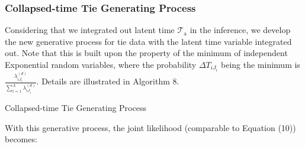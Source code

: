 \documentclass[a4paper]{article}
\begin{document}
        \subsubsection{Collapsed-time Tie Generating Process} \label{subsubsec: collapsed time Generative Process}
        Considering that we integrated out latent time $\mathcal{T}_{\mbox{a}}$ in the inference, we develop the new generative process for tie data with the latent time variable integrated out. Note that this is built upon the property of the minimum of independent Exponential random variables, where the probability $\Delta T_{i{J_i}}$ being the minimum is $\frac{\lambda_{i{J_i}}^{(d)}}{\sum_{i=1}^A\lambda_{i{J_i}}^{(d)}}$. Details are illustrated in Algorithm 8.
        \begin{algorithm}[H]
        	\SetAlgoLined
        	\caption{Collapsed-time Tie Generating Process}
        \end{algorithm}
        \noindent With this generative process, the joint likelihood (comparable to Equation (10)) becomes:
\end{document}
